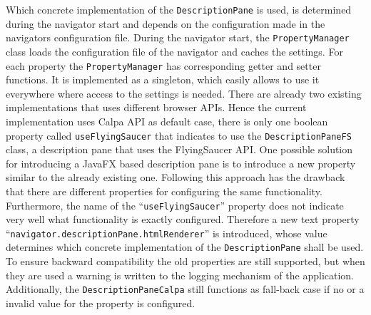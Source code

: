 Which concrete implementation of the \texttt{DescriptionPane} is used, is determined during the navigator start and depends on the configuration made in the navigators configuration file.
During the navigator start, the \texttt{PropertyManager} class loads the configuration file of the navigator and caches the settings.
For each property the \texttt{PropertyManager} has corresponding getter and setter functions.
It is implemented as a singleton, which easily allows to use it everywhere where access to the settings is needed.
There are already two existing implementations that uses different browser APIs.
Hence the current implementation uses Calpa API as default case, there is only one boolean property called \texttt{useFlyingSaucer} that indicates to use the \texttt{DescriptionPaneFS} class, a description pane that uses the  FlyingSaucer API.
One possible solution for introducing a JavaFX based description pane is to introduce a new property similar to the already existing one.
Following this approach has the drawback that there are different properties for configuring the same functionality.
Furthermore, the name of the \enquote{\texttt{useFlyingSaucer}} property does not indicate very well what functionality is exactly configured.
Therefore a new text property \enquote{\texttt{navigator.descriptionPane.htmlRenderer}} is introduced, whose value determines which concrete implementation of the \texttt{DescriptionPane} shall be used.
To ensure backward compatibility the old properties are still supported, but when they are used a warning is written to the logging mechanism of the application.
Additionally, the \texttt{DescriptionPaneCalpa} still functions as fall-back case if no or a invalid value for the property is configured.

